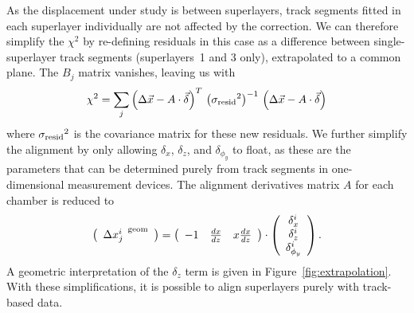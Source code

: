 As the displacement under study is between superlayers, track segments
fitted in each superlayer individually are not affected by the
correction.  We can therefore simplify the $\chi^2$ by re-defining
residuals in this case as a difference between single-superlayer track
segments (superlayers~1 and 3 only), extrapolated to a common plane.
The $B_j$ matrix vanishes, leaving us with
\begin{equation}
\chi^2 = \sum_j \left(\Delta \vec{x} - A \cdot \vec{\delta}\right)^T \, \left({\sigma_{\mbox{\scriptsize resid}}}^2\right)^{-1} \, \left(\Delta \vec{x} - A \cdot \vec{\delta}\right)
\end{equation}
where ${\sigma_{\mbox{\scriptsize resid}}}^2$ is the covariance matrix
for these new residuals.  We further simplify the alignment by only
allowing $\delta_x$, $\delta_z$, and $\delta_{\phi_y}$ to float, as
these are the parameters that can be determined purely from track
segments in one-dimensional measurement devices.  The alignment
derivatives matrix $A$ for each chamber is reduced to
\begin{equation}
\left(\begin{array}{c} 
{\Delta x^i_j}^{\mbox{\scriptsize \, geom}} \\
\end{array}\right) = 
\left(\begin{array}{c c c c c c}
-1 & \frac{dx}{dz} & x\frac{dx}{dz}  \\
\end{array}\right)\cdot
\left(\begin{array}{c} 
\delta_x^i \\
\delta_z^i \\
\delta_{\phi_y}^i \\
\end{array}\right) \mbox{.}
\end{equation}
A geometric interpretation of the $\delta_z$ term is given in
Figure~\ref{fig:extrapolation}.  With these simplifications, it is
possible to align superlayers purely with track-based data.

